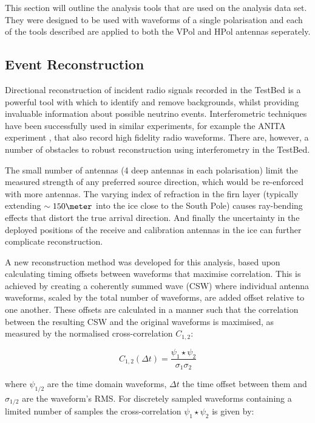 This section will outline the analysis tools that are used on the analysis data set. They were designed to be used with waveforms of a single polarisation and each of the tools described are applied to both the VPol and HPol antennas seperately.


\subsection{Event Reconstruction}
\label{sec:Analysis:Reconstruction}

Directional reconstruction of incident radio signals recorded in the TestBed is a powerful tool with which to identify and remove backgrounds, whilst providing invaluable information about possible neutrino events. Interferometric techniques have been successfully used in similar experiments, for example the ANITA experiment \cite{HooverThesis} \cite{AbbyThesis} \cite{MattThesis} \cite{AndresThesis}, that also record high fidelity radio waveforms. There are, however, a number of obstacles to robust reconstruction using interferometry in the TestBed. 

The small number of antennas (4 deep antennas in each polarisation) limit the measured strength of any preferred source direction, which would be re-enforced with more antennas. The varying index of refraction in the firn layer (typically extending $\sim 150 \meter$ into the ice close to the South Pole) causes ray-bending effects that distort the true arrival direction. And finally the uncertainty in the deployed positions of the receive and calibration antennas in the ice can further complicate reconstruction. 


A new reconstruction method was developed for this analysis, based upon calculating timing offsets between waveforms that maximise correlation. This is achieved by creating a coherently summed wave (CSW) where individual antenna waveforms, scaled by the total number of waveforms, are added offset relative to one another. These offsets are calculated in a manner such that the correlation between the resulting CSW and the original waveforms is maximised, as measured by the normalised cross-correlation $C_{1,2}$:


\begin{equation}
  C_{1,2}(\Delta t) = \frac{\psi_{1} \star \psi_{2}}{\sigma_{1} \sigma_{2}}
  \label{eq:analysis:Reconstruction:Normalised-Cross-Correlation}
\end{equation}

\noindent where $\psi_{1/2}$ are the time domain waveforms, $\Delta t$ the time offset between them and $\sigma_{1/2}$ are the waveform's RMS. For discretely sampled waveforms containing a limited number of samples the cross-correlation $\psi_{1} \star \psi_{2}$ is given by:

